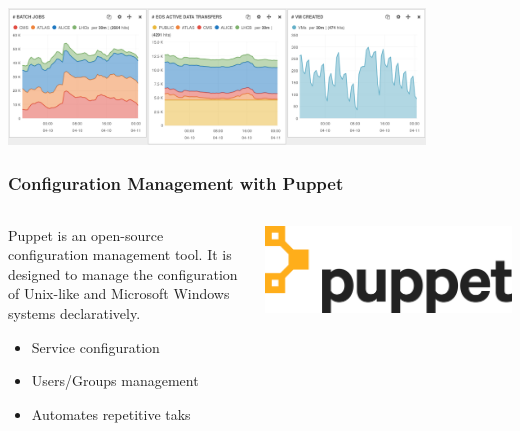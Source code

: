 \documentclass[aspectratio=169]{beamer}
\begin{document}
\begin{frame}
    \vspace{\belowdisplayskip}
    \begin{minipage}[t]{0.95\textwidth}
        \begin{center}
        \includegraphics[width=0.83\textwidth]{Eos-CreatedVm.png}
    \end{center}
    \end{minipage}
\end{frame}


\begin{frame}
    \frametitle{Configuration Management with Puppet}
    \begin{minipage}[t]{0.95\textwidth}
        \begin{columns}
            \begin{column}{0.5\textwidth}
                Puppet is an open-source configuration management tool.
                It is designed to manage the configuration of Unix-like and Microsoft Windows systems declaratively. \\
                \begin{itemize}
                    \item Service configuration
                    \item Users/Groups management
                    \item Automates repetitive taks
                \end{itemize}
            \end{column}
            \begin{column}{0.5\textwidth}
                \vspace{-10px}
                \includegraphics[width=1.1\textwidth]{puppet-labs-logo.png}
            \end{column}
        \end{columns}
    \end{minipage}
\end{frame}
\end{document}
